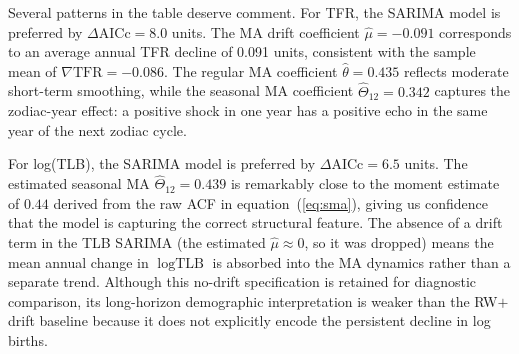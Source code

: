 \documentclass[12pt,a4paper]{article}
\begin{document}
\begin{table}[H]
\centering
\caption{Estimated models for both series. AICc and Ljung--Box results are reported
         for both $m=10$ and $m=15$. The preferred model for each series is marked
         with $\checkmark$.}
\label{tab:models}
\end{table}

Several patterns in the table deserve comment. For TFR, the SARIMA model is preferred
by $\Delta\text{AICc}=8.0$ units. The MA drift coefficient $\hat\mu=-0.091$
corresponds to an average annual TFR decline of 0.091 units, consistent with the
sample mean of $\nabla\text{TFR}=-0.086$. The regular MA coefficient $\hat\theta=0.435$
reflects moderate short-term smoothing, while the seasonal MA coefficient
$\hat\Theta_{12}=0.342$ captures the zodiac-year effect: a positive shock in one
year has a positive echo in the same year of the next zodiac cycle.

For log(TLB), the SARIMA model is preferred by $\Delta\text{AICc}=6.5$ units. The estimated seasonal MA $\hat\Theta_{12}=0.439$ is
remarkably close to the moment estimate of $0.44$ derived from the raw ACF in
equation~(\ref{eq:sma}), giving us confidence that the model is capturing the
correct structural feature. The absence of a drift term in the TLB SARIMA (the
estimated $\hat\mu\approx 0$, so it was dropped) means the mean annual change in
$\log\text{TLB}$ is absorbed into the MA dynamics rather than a separate trend.
Although this no-drift specification is retained for diagnostic comparison, its
long-horizon demographic interpretation is weaker than the RW$+$drift baseline
because it does not explicitly encode the persistent decline in log births.
\end{document}
